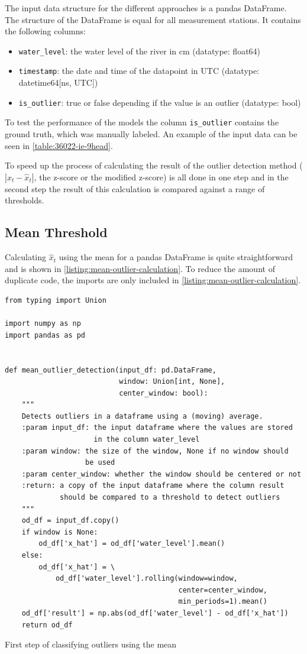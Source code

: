 The input data structure for the different approaches is a pandas DataFrame.\cite{PandasDocumentationPandas} The structure of the DataFrame is equal for all measurement stations. It contains the following columns:
\begin{itemize}
    \item \verb|water_level|: the water level of the river in cm (datatype: float64)
    \item \verb|timestamp|: the date and time of the datapoint in UTC (datatype: datetime64[ns, UTC])
    \item \verb|is_outlier|: true or false depending if the value is an outlier (datatype: bool)
\end{itemize}
To test the performance of the models the column \verb|is_outlier| contains the ground truth, which was manually labeled. An example of the input data can be seen in \autoref{table:36022-ie-9head}.


To speed up the process of calculating the result of the outlier detection method ($|x_t - \hat{x}_t|$, the z-score or the modified z-score) is all done in one step and in the second step the result of this calculation is compared against a range of thresholds.
\subsection{Mean Threshold}
Calculating $\hat{x}_t$ using the mean for a pandas DataFrame \cite{PandasDocumentationPandas} is quite straightforward and is shown in \autoref{listing:mean-outlier-calculation}. To reduce the amount of duplicate code, the imports are only included in \autoref{listing:mean-outlier-calculation}.
\begin{listing}
\begin{verbatim}
from typing import Union

import numpy as np
import pandas as pd


def mean_outlier_detection(input_df: pd.DataFrame,
                           window: Union[int, None],
                           center_window: bool):
    """
    Detects outliers in a dataframe using a (moving) average.
    :param input_df: the input dataframe where the values are stored
                     in the column water_level
    :param window: the size of the window, None if no window should
                   be used
    :param center_window: whether the window should be centered or not
    :return: a copy of the input dataframe where the column result
             should be compared to a threshold to detect outliers
    """
    od_df = input_df.copy()
    if window is None:
        od_df['x_hat'] = od_df['water_level'].mean()
    else:
        od_df['x_hat'] = \
            od_df['water_level'].rolling(window=window,
                                         center=center_window,
                                         min_periods=1).mean()
    od_df['result'] = np.abs(od_df['water_level'] - od_df['x_hat'])
    return od_df
\end{verbatim}
\caption{First step of classifying outliers using the mean}
\label{listing:mean-outlier-calculation}
\end{listing}

